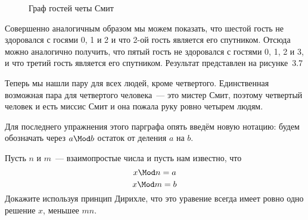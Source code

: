 \begin{example}
\begin{figure}[h]
\caption{Граф гостей четы Смит}
\end{figure}

Совершенно аналогичным образом мы можем показать, что шестой гость не здоровался с госями 0, 1 и 2 и что 2-ой гость является его спутником. Отсюда можно аналогично получить, что пятый гость не здоровался с гостями 0, 1, 2 и 3, и что третий гость является его спутником. Результат представлен на рисунке~3.7

Теперь мы нашли пару для всех людей, кроме четвертого. Единственная возможная пара для четвертого человека~--- это мистер Смит, поэтому четвертый человек и есть миссис Смит и она пожала руку ровно четырем людям.
\end{example}

Для последнего упражнения этого парграфа опять введём новую нотацию: будем обозначать через $a\Mod b$ остаток от деления $a$ на $b$.

\begin{exercise}
Пусть $n$ и $m$~--- взаимопростые числа и пусть нам известно, что
$$x\Mod n = a$$
$$x\Mod m = b$$
Докажите используя принцип Дирихле, что это уравение всегда имеет ровно одно решение $x$, меньшее $mn$.
\end{exercise}